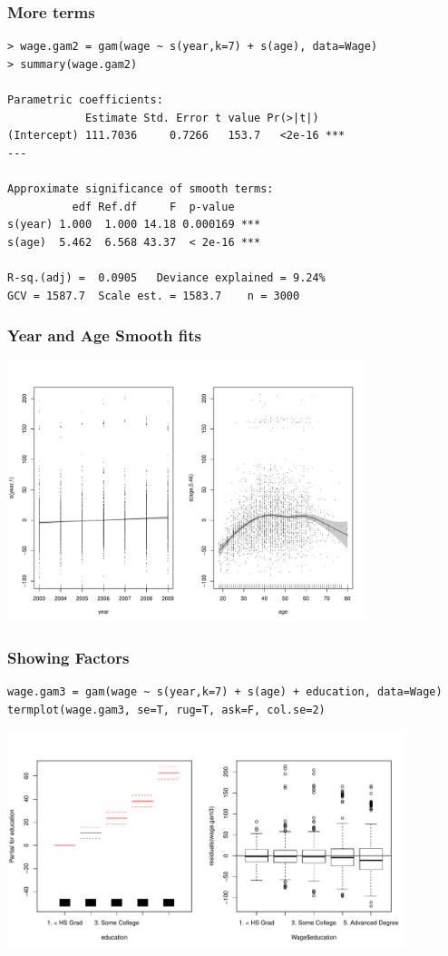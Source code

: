 \documentclass[]{beamer}
\begin{document}
\begin{frame}[fragile]\frametitle{More terms}
\begin{verbatim}
> wage.gam2 = gam(wage ~ s(year,k=7) + s(age), data=Wage)
> summary(wage.gam2)

Parametric coefficients:
            Estimate Std. Error t value Pr(>|t|)    
(Intercept) 111.7036     0.7266   153.7   <2e-16 ***
---

Approximate significance of smooth terms:
          edf Ref.df     F  p-value    
s(year) 1.000  1.000 14.18 0.000169 ***
s(age)  5.462  6.568 43.37  < 2e-16 ***

R-sq.(adj) =  0.0905   Deviance explained = 9.24%
GCV = 1587.7  Scale est. = 1583.7    n = 3000
\end{verbatim}
\end{frame}
\begin{frame}\frametitle{Year and Age Smooth fits}
  \centerline{\includegraphics[height=3in]{gam-age-year}}
\end{frame}

\begin{frame}[fragile]\frametitle{Showing Factors}
\begin{verbatim}
wage.gam3 = gam(wage ~ s(year,k=7) + s(age) + education, data=Wage)
termplot(wage.gam3, se=T, rug=T, ask=F, col.se=2)
\end{verbatim}
\centerline{\includegraphics[height=2.5in]{edu-term}}
\end{frame}
\end{document}
